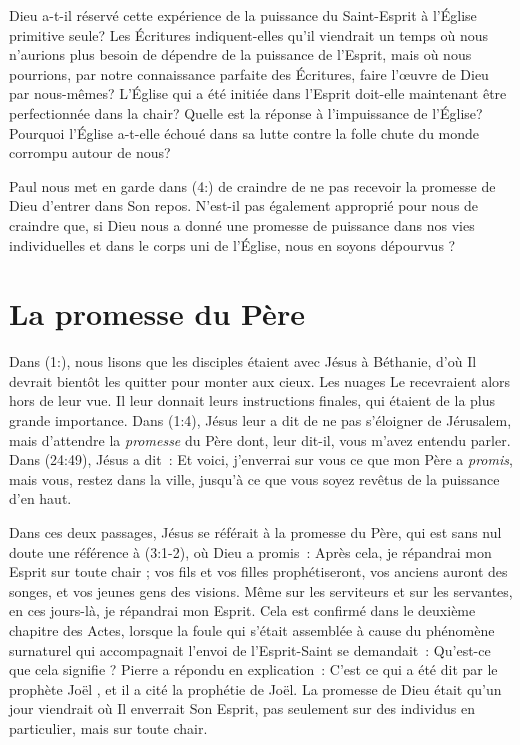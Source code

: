 Dieu a-t-il réservé cette expérience de la puissance du Saint-Esprit à
 l'Église primitive seule? Les Écritures indiquent-elles qu'il viendrait
 un temps où nous n'aurions plus besoin de dépendre de la puissance
 de l'Esprit, mais où nous pourrions, par notre connaissance parfaite
 des Écritures, faire l'œuvre de Dieu par nous-mêmes? L'Église qui a été
 initiée dans l'Esprit doit-elle maintenant être perfectionnée dans
 la chair?
 Quelle est la réponse à l'impuissance de l'Église?
 Pourquoi l'Église a-t-elle échoué dans sa lutte contre la folle chute
 du monde corrompu autour de nous?

Paul nous met en garde dans (4:) de craindre de ne pas
 recevoir la promesse de Dieu d'entrer dans Son repos.
 N'est-il pas également approprié pour nous de craindre que, si Dieu
 nous a donné une promesse de puissance dans nos vies individuelles et
 dans le corps uni de l'Église, nous en soyons dépourvus ?


\section{La promesse du P\`ere}

Dans (1:), nous lisons que les disciples étaient avec
 Jésus à Béthanie, d'où Il devrait bientôt les quitter pour monter
 aux cieux.
 Les nuages Le recevraient alors hors de leur vue.
 Il leur donnait leurs instructions finales, qui étaient de la plus
 grande importance.
 Dans (1:4), Jésus leur a dit de \og ne pas s'éloigner
 de Jérusalem, mais d'attendre la \emph{promesse} du Père dont, leur dit-il,
 vous m'avez entendu parler. \fg{}
 Dans (24:49), Jésus a dit~:
 \og Et voici, j'enverrai sur vous ce que mon Père a \emph{promis}, mais vous,
 restez dans la ville, jusqu'à ce que vous soyez revêtus de la puissance
 d'en haut.\fg{}

Dans ces deux passages, Jésus se référait à la promesse du Père, qui est
 sans nul doute une référence à (3:1-2), où Dieu a promis~:
 \og Après cela, je répandrai mon Esprit sur toute chair ;
 vos fils et vos filles prophétiseront, vos anciens auront des songes,
 et vos jeunes gens des visions.
 Même sur les serviteurs et sur les servantes,
 en ces jours-là, je répandrai mon Esprit. \fg{}
 Cela est confirmé dans le deuxième chapitre des Actes, lorsque la foule qui
 s'était assemblée à cause du phénomène surnaturel qui accompagnait l'envoi
 de l'Esprit-Saint se demandait~:
 \og Qu'est-ce que cela signifie ? \fg{}
 Pierre a répondu en explication~:
 \og C'est ce qui a été dit par le prophète Joël \fg{},
 et il a cité la prophétie de Joël.
 La promesse de Dieu était qu'un jour viendrait où Il enverrait Son Esprit,
 pas seulement sur des individus en particulier, mais sur toute chair.

